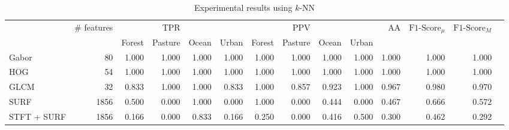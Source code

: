 \documentclass[journal]{IEEEtran}
\begin{document}
\begin{table}%
	\centering
	\caption{ \color{blue}Experimental results using $k$-NN}
	\label{tab:result1}
	\begin{tabular}{lrrrr*9{r}}
		\toprule
		\color{blue}
		\multirow{2}{*}{Method} & \multirow{2}{*}{ \color{blue} \# features} & &  \color{blue}TPR & & & & \color{blue} PPV & & & \multirow{2}{*}{ \color{blue}AA} & \multirow{2}{*}{ \color{blue}$\text{F1-Score}_{\mu}$} & \multirow{2}{*}{ \color{blue}$\text{F1-Score}_M$} \\
		\cmidrule(lr){3-6} 
		\cmidrule(lr){7-10}
		
		&   & \color{blue} Forest &  \color{blue}Pasture &  \color{blue}Ocean &  \color{blue}Urban &  \color{blue}Forest &  \color{blue}Pasture &  \color{blue}Ocean &  \color{blue}Urban & &  \\
		\cmidrule(lr){1-1}
		\cmidrule(lr){2-2}
		\cmidrule(lr){3-6}
		\cmidrule(lr){7-10}
		\cmidrule(lr){11-11}
		\cmidrule(lr){12-12}
		\cmidrule(lr){13-13}
		 \color{blue}Gabor &  \color{blue}80 & 
		 \color{blue}1.000 & \color{blue} 1.000 &  \color{blue}1.000 & \color{blue} 1.000 & 
	 \color{blue}	1.000 &  \color{blue}1.000 &  \color{blue}1.000 &  \color{blue}1.000 & 
		 \color{blue}1.000 &  \color{blue}1.000 &  \color{blue}1.000\\
		 \color{blue}HOG &  \color{blue}54 & 
	 \color{blue}	1.000 &  \color{blue}1.000 &  \color{blue}1.000 & \color{blue} 1.000 & 
	 \color{blue}	1.000 & \color{blue} 1.000 & \color{blue} 1.000 &  \color{blue}1.000 & 
	 \color{blue}	1.000 & \color{blue} 1.000 & \color{blue} 1.000\\
		 \color{blue}GLCM & \color{blue} 32 & 
		 \color{blue}0.833 &  \color{blue}1.000 &  \color{blue}1.000 &  \color{blue}0.833 &
		 \color{blue}1.000 &  \color{blue}0.857 & \color{blue} 0.923 & \color{blue}  \color{blue}1.000 &
	 \color{blue}	0.967 & \color{blue} 0.980 & \color{blue} 0.970\\
		 \color{blue}SURF & \color{blue} 1856 & 
	 \color{blue}	0.500 &  \color{blue}0.000 & \color{blue} 1.000 & \color{blue} 0.000 & 
	 \color{blue}	1.000 & \color{blue} 0.000 & \color{blue} 0.444 & \color{blue} 0.000 &
		 \color{blue}0.467 &  \color{blue}0.666 &  \color{blue}0.572\\
		 \color{blue}STFT + SURF  &  \color{blue}1856 & 
		 \color{blue}0.166 &  \color{blue}0.000 &  \color{blue}0.833 & \color{blue} 0.166 & 
	 \color{blue}	0.250 &  \color{blue}0.000 & \color{blue} 0.416 & \color{blue} 0.500 &
	 \color{blue}	0.300 & \color{blue} 0.462 &  \color{blue}0.292\\

\end{tabular}
\end{table}
\end{document}

